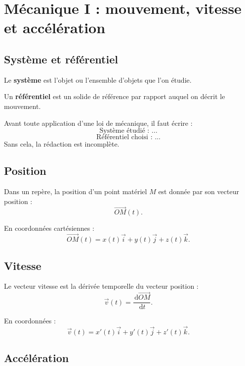 \documentclass[11pt,a4paper]{article}
\newcommand{\dd}{\,\mathrm{d}}
\begin{document}
\section{Mécanique I : mouvement, vitesse et accélération}

\subsection{Système et référentiel}

\begin{definition}
Le \textbf{système} est l'objet ou l'ensemble d'objets que l'on étudie.
\end{definition}

\begin{definition}
Un \textbf{référentiel} est un solide de référence par rapport auquel on décrit le mouvement.
\end{definition}

\begin{alerte}
Avant toute application d'une loi de mécanique, il faut écrire :
\[
\text{Système étudié : ...}
\]
\[
\text{Référentiel choisi : ...}
\]
\]
Sans cela, la rédaction est incomplète.
\end{alerte}

\subsection{Position}

Dans un repère, la position d'un point matériel $M$ est donnée par son vecteur position :
\[
\vec{OM}(t).
\]

En coordonnées cartésiennes :
\[
\vec{OM}(t)=x(t)\vec i+y(t)\vec j+z(t)\vec k.
\]

\subsection{Vitesse}

\begin{definition}
Le vecteur vitesse est la dérivée temporelle du vecteur position :
\[
\vec v(t)=\frac{\dd \vec{OM}}{\dd t}.
\]
\end{definition}

En coordonnées :
\[
\vec v(t)=x'(t)\vec i+y'(t)\vec j+z'(t)\vec k.
\]

\subsection{Accélération}
\end{document}

